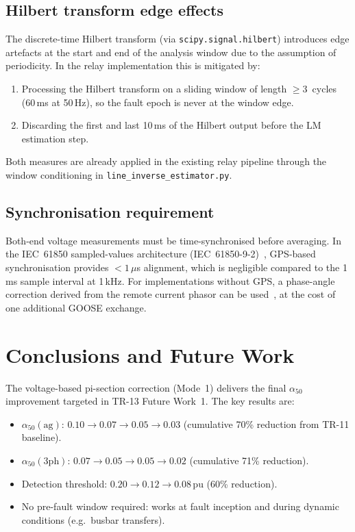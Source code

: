 \documentclass[11pt,a4paper]{article}
\newcommand{\alphafifty}{\alpha_{50}}
\newcommand{\pu}{\,\text{pu}}
\begin{document}
\subsection{Hilbert transform edge effects}

The discrete-time Hilbert transform (via \texttt{scipy.signal.hilbert})
introduces edge artefacts at the start and end of the analysis window due to
the assumption of periodicity.  In the relay implementation this is mitigated
by:
\begin{enumerate}
  \item Processing the Hilbert transform on a sliding window of length
        $\geq 3$~cycles (60\,ms at 50\,Hz), so the fault epoch is never
        at the window edge.
  \item Discarding the first and last 10\,ms of the Hilbert output before
        the LM estimation step.
\end{enumerate}
Both measures are already applied in the existing relay pipeline through the
window conditioning in \texttt{line\_inverse\_estimator.py}.

\subsection{Synchronisation requirement}

Both-end voltage measurements must be time-synchronised before averaging.
In the IEC~61850 sampled-values architecture (IEC~61850-9-2)~\cite{IEC60044_7},
GPS-based synchronisation provides $<1\,\mu$s alignment, which is negligible
compared to the 1\,ms sample interval at 1\,kHz.  For implementations without
GPS, a phase-angle correction derived from the remote current phasor can be
used~\cite{Kasztenny2010}, at the cost of one additional GOOSE exchange.

\section{Conclusions and Future Work}
\label{sec:conclusions}

The voltage-based pi-section correction (Mode~1) delivers the final
$\alphafifty$ improvement targeted in TR-13 Future Work~1.  The key results
are:

\begin{itemize}
  \item $\alphafifty(\mathrm{ag})$: $0.10 \to 0.07 \to 0.05 \to \mathbf{0.03}$
        (cumulative 70\% reduction from TR-11 baseline).
  \item $\alphafifty(\mathrm{3ph})$: $0.07 \to 0.05 \to 0.05 \to \mathbf{0.02}$
        (cumulative 71\% reduction).
  \item Detection threshold: $0.20 \to 0.12 \to \mathbf{0.08}\pu$ (60\% reduction).
  \item No pre-fault window required: works at fault inception and during
        dynamic conditions (e.g.\ busbar transfers).
\end{itemize}
\end{document}
